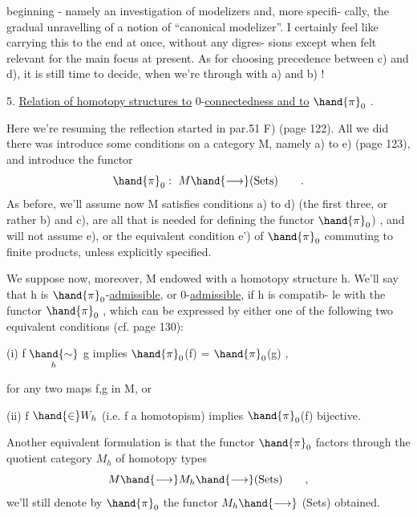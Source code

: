 
beginning  -  namely an investigation of modelizers and,  more specifi-%
cally,  the gradual unravelling of a notion of ``canonical modelizer''.  I
certainly feel like carrying this to the end at once,  without any digres-%
sions except when felt relevant for the main focus at present.  As for
choosing precedence between c) and d),  it is still time to decide,  when
we're through with a) and b) !

5.  \uline{Relation of homotopy structures to} 0-\uline{connectedness and to} $\hand{\pi}_0$ .

Here we're resuming the reflection started in par.51 F) (page 122).
All we did there was introduce some conditions on a category M,  namely
a) to e)  (page 123),  and introduce the functor
\[ \hand{\pi}_0 :\ M \hand{\longrightarrow} (\mathrm{Sets}) \qquad . \]
As before,  we'll assume now M satisfies conditions a) to d)  (the first
three, or rather b) and c),  are all that is needed for defining the
functor $\hand{\pi}_0$) ,  and will not assume e),  or the equivalent condition e')
of $\hand{\pi}_0$ commuting to  finite products,  unless explicitly specified.

We suppose now,  moreover,  M endowed with a homotopy structure h.
We'll say that h is $\hand{\pi}_0$-\uline{admissible},  or  0-\uline{admissible},  if  h is compatib-%
le with the functor $\hand{\pi}_0$ ,  which can be expressed by either one of the
following two equivalent conditions (cf. page 130):

(i)  f $\underset{h}{\hand{\sim}}$ g  implies $\hand{\pi}_0$(f) = $\hand{\pi}_0$(g)  ,

for any two maps  f,g in M,  or

(ii)  f $\hand{\in} W_h$ (i.e. f a homotopism)  implies $\hand{\pi}_0$(f) bijective.

Another equivalent formulation is that the functor $\hand{\pi}_0$ factors through
the quotient category $M_h$ of homotopy types
\[ M \hand{\longrightarrow} M_h \hand{\longrightarrow} (\mathrm{Sets}) \qquad , \]
we'll still denote by $\hand{\pi}_0$ the functor $M_h \hand{\longrightarrow}$ (Sets)  obtained.

